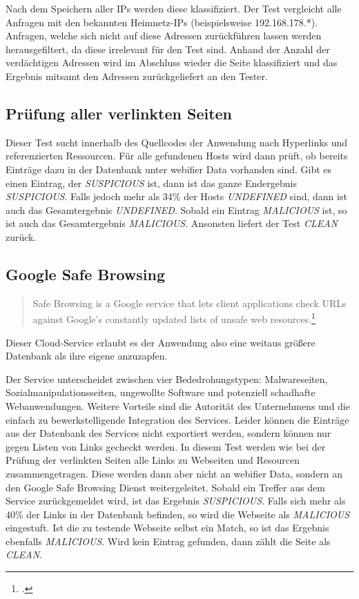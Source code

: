 Nach dem Speichern aller IPs werden diese klassifiziert. Der Test vergleicht alle Anfragen mit den bekannten Heimnetz-IPs (beispielsweise 192.168.178.*). Anfragen, welche sich nicht auf diese Adressen zurückführen lassen werden herausgefiltert, da diese irrelevant für den Test sind. Anhand der Anzahl der verdächtigen Adressen wird im Abschluss wieder die Seite klassifiziert und das Ergebnis mitsamt den Adressen zurückgeliefert an den Tester.

\subsection{Prüfung aller verlinkten Seiten}
\label{sec:konzept-linkchecker}

Dieser Test sucht innerhalb des Quellcodes der Anwendung nach Hyperlinks und referenzierten Ressourcen.
Für alle gefundenen Hosts wird dann prüft, ob bereits Einträge dazu in der Datenbank unter webifier Data vorhanden sind.
Gibt es einen Eintrag, der \textit{SUSPICIOUS} ist, dann ist das ganze Endergebnis \textit{SUSPICIOUS}.
Falls jedoch mehr als 34\% der Hosts \textit{UNDEFINED} sind, dann ist auch das Gesamtergebnis \textit{UNDEFINED}.
Sobald ein Eintrag \textit{MALICIOUS} ist, so ist auch das Gesamtergebnis \textit{MALICIOUS}.
Ansonsten liefert der Test \textit{CLEAN} zurück.

\subsection{Google Safe Browsing}

\begin{quote}
	Safe Browsing is a Google service that lets client applications check URLs against Google's constantly updated lists of unsafe web resources.\footcite[Vgl.][]{googleSafeBrowsing}
\end{quote}

Dieser Cloud-Service erlaubt es der Anwendung also eine weitaus größere Datenbank als ihre eigene anzuzapfen.

Der Service unterscheidet zwischen vier Bededrohungstypen\label{par:konzep-gsb-types}: Malwareseiten, Sozialmanipulationsseiten, ungewollte Software und potenziell schadhafte Webanwendungen.
Weitere Vorteile sind die Autorität des Unternehmens und die einfach zu bewerkstelligende Integration des Services.
Leider können die Einträge aus der Datenbank des Services nicht exportiert werden, sondern können nur gegen Listen von Links gecheckt werden.
In diesem Test werden wie bei der Prüfung der verlinkten Seiten alle Links zu Webseiten und Resourcen zusammengetragen.
Diese werden dann aber nicht an webifier Data, sondern an den Google Safe Browsing Dienst weitergeleitet.
Sobald ein Treffer aus dem Service zurückgemeldet wird, ist das Ergebnis \textit{SUSPICIOUS}.
Falls sich mehr als 40\% der Links in der Datenbank befinden, so wird die Webseite als \textit{MALICIOUS} eingestuft.
Ist die zu testende Webseite selbst ein Match, so ist das Ergebnis ebenfalls \textit{MALICIOUS}.
Wird kein Eintrag gefunden, dann zählt die Seite als \textit{CLEAN}.

